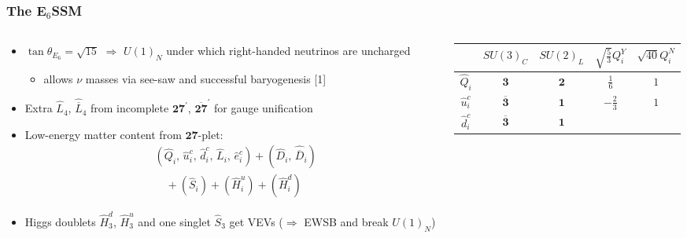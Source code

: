 \documentclass[10pt,aspectratio=169]{beamer}
\begin{document}
\begin{frame}
  \frametitle{The E$_6$SSM}
    \begin{columns}[t]
      \begin{column}{0.5\textwidth}
        \begin{itemize}
          \vfill
        \item $\tan\theta_{E_6} = \sqrt{15}$ $\Rightarrow$ $U(1)_N$
          under which right-handed neutrinos are uncharged
          \begin{itemize}
          \item allows $\nu$ masses via see-saw and
            successful baryogenesis [1]
          \end{itemize}
          \vfill
        \item Extra $\hat{L}_4$, $\hat{\overline{L}}_4$ from incomplete
          $\mathbf{27}^\prime$, $\mathbf{\overline{27}}^\prime$ for gauge
          unification
          \vfill
        \item Low-energy matter content from $\mathbf{27}$-plet:
          \begin{align*}
            &(\hat{Q}_i, \, \hat{u}^c_i, \, \hat{d}^c_i, \, \hat{L}_i, \,
            \hat{e}^c_i) + (\hat{D}_i, \, \hat{\overline{D}}_i)\\
            &\quad {} + (\hat{S}_{i}) + (\hat{H}^u_i) + (\hat{H}^d_i)
          \end{align*}
          \vfill
        \item Higgs doublets $\hat{H}^d_3$, $\hat{H}^u_3$ and one singlet
          $\hat{S}_3$ get VEVs ($\Rightarrow$ EWSB and break $U(1)_N$)
          \vfill
        \end{itemize}
      \end{column}
      \begin{column}{0.5\textwidth}
        \vspace{-40pt}
        \begin{table}[h]
          \centering
          \begin{tabular}{ccccc}
            \toprule
            & $SU(3)_C$ & $SU(2)_L$ & $\sqrt{\frac{5}{3}} Q_i^Y$
            & $\sqrt{40} Q_i^N$ \\
            \midrule
            $\hat{Q}_i$ & $\mathbf{3}$ & $\mathbf{2}$ & $\frac{1}{6}$ & $1$ \\
            $\hat{u}_i^c$ & $\mathbf{\overline{3}}$ & $\mathbf{1}$
            & $-\frac{2}{3}$ & $1$ \\
            $\hat{d}_i^c$ & $\mathbf{\overline{3}}$ & $\mathbf{1}$

\end{tabular}
\end{table}
\end{column}
\end{columns}
\end{frame}
\end{document}
